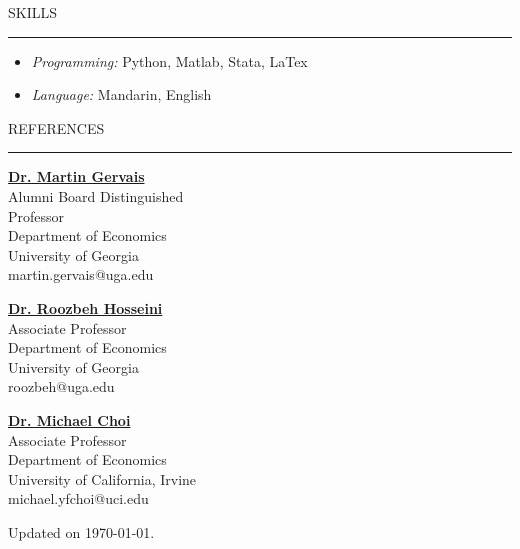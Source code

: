 \documentclass{resume} %
\renewenvironment{rSection}[1]{
\sectionskip
\textcolor{lmublue}{\MakeUppercase{#1}}
\sectionlineskip
\hrule
\begin{list}{}{
\setlength{\leftmargin}{1.5em}
}
\item[]
}{
\end{list}
}
\begin{document}
			
\begin{rSection}{SKILLS} 
\begin{itemize} 
\item[] {\sl Programming:} Python, Matlab, Stata, LaTex 
\item[] {\sl Language:} Mandarin, English 
\end{itemize} 
\end{rSection}


\begin{rSection}{REFERENCES} 
\begin{minipage}{.33\textwidth}
 \href{https://www.terry.uga.edu/directory/economics/martin-gervais.html}{\bf Dr. Martin Gervais} \\
  Alumni Board Distinguished \\ Professor \\
Department of Economics \\
University of Georgia\\
martin.gervais@uga.edu 
\end{minipage}%
\begin{minipage}{.33\textwidth}
 \href{https://www.roozbeh-hosseini.com}{\bf Dr. Roozbeh Hosseini} \\
Associate Professor \\
Department of Economics \\
University of Georgia\\
 roozbeh@uga.edu \\
 \end{minipage}
\begin{minipage}{.33\textwidth}
 \href{http://michaelyfchoi.weebly.com}{\bf Dr. Michael Choi} \\
 Associate Professor \\
Department of Economics \\
 University of California, Irvine  \\
 michael.yfchoi@uci.edu \\
\end{minipage}
\end{rSection}


\vspace*{\fill}

\hfill Updated on \today. 
\end{document}
